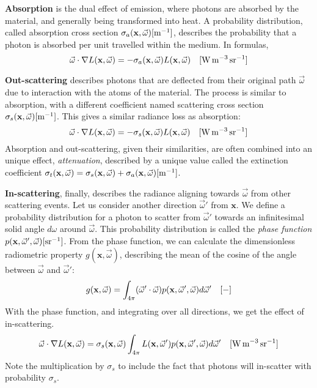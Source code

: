 \textbf{Absorption} is the dual effect of emission, where photons are absorbed by the material, and generally being transformed into heat. A probability distribution, called absorption cross section $\sigma_a(\mathbf{x}, \vec{\omega})  [\SI{}{\per \metre}] $, describes the probability that a photon is absorbed per unit travelled within the medium. In formulas,
\begin{equation*}
\vec{\omega} \cdot \nabla L(\mathbf{x}, \vec{\omega}) = - \sigma_a(\mathbf{x}, \vec{\omega}) L(\mathbf{x}, \vec{\omega})  \siunit{\watt \per \cubic \metre \per \steradian}
 \end{equation*}

\textbf{Out-scattering} describes photons that are deflected from their original path $\vec{\omega}$  due to interaction with the atoms of the material. The process is similar to absorption, with a different coefficient named scattering cross section $\sigma_s(\mathbf{x}, \vec{\omega}) [\SI{}{\per \metre}]$. This gives a similar radiance loss as absorption:
\begin{equation*}
\vec{\omega} \cdot \nabla L(\mathbf{x}, \vec{\omega}) = - \sigma_s(\mathbf{x}, \vec{\omega}) L(\mathbf{x}, \vec{\omega})
 \siunit{\watt \per \cubic \metre \per \steradian}
\end{equation*}
Absorption and out-scattering, given their similarities, are often combined into an unique effect, \emph{attenuation}, described by a unique value called the extinction coefficient $\sigma_t(\mathbf{x}, \vec{\omega}) =\sigma_s(\mathbf{x}, \vec{\omega}) + \sigma_a(\mathbf{x}, \vec{\omega}) [\SI{}{\per \metre}]$.

\textbf{In-scattering}, finally, describes the radiance aligning towards $\vec{\omega}$ from other scattering events. Let us consider another direction $\vec{\omega}'$ from $\mathbf{x}$. We define a probability distribution for a photon to scatter from $\vec{\omega}'$ towards an infinitesimal solid angle $d{\omega}$ around $\vec{\omega}$. This probability distribution is called the \emph{phase function}  $p(\mathbf{x}, \vec{\omega}', \vec{\omega}) \siunitnospace{ \per \steradian}$. From the phase function, we can calculate the dimensionless radiometric property $g(\mathbf{x}, \vec{\omega})$, describing the mean of the cosine of the angle between $\vec{\omega}$ and $\vec{\omega}'$:
\begin{equation*}
g(\mathbf{x}, \vec{\omega}) = \int_{4\pi} (\vec{\omega}' \cdot \vec{\omega}) p(\mathbf{x}, \vec{\omega}', \vec{\omega}) d\vec{\omega}'
\ \ \ [\SI{}{-}]
\end{equation*}
With the phase function, and integrating over all directions, we get the effect of in-scattering.
\begin{equation*}
\vec{\omega} \cdot \nabla L(\mathbf{x}, \vec{\omega}) = \sigma_s(\mathbf{x}, \vec{\omega}) \int_{4\pi} L(\mathbf{x}, \vec{\omega}')  p(\mathbf{x}, \vec{\omega}', \vec{\omega}) d \vec{\omega}'\siunit{\watt \per \cubic \metre \per \steradian}
\end{equation*}
Note the multiplication by $\sigma_s$ to include the fact that photons will in-scatter with probability $\sigma_s$. 

